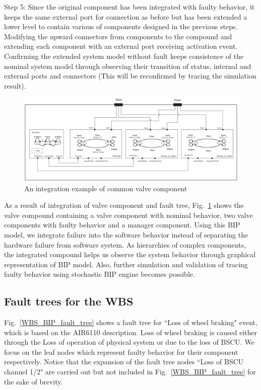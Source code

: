 Step 5: Since the original component has been integrated with faulty behavior, it keeps the same external port for connection as before but has been extended a lower level to contain various of components designed in the previous steps. Modifying the upward connectors from components to the compound and extending each component with an external port receiving activation event. Confirming the extended system model without fault keeps consistence of the nominal system model through observing their transition of status, internal and external ports and connectors (This will be reconfirmed by tracing the simulation result).

\begin{figure}[t]
	\centerline{\includegraphics[width=125mm]{figure/Example.eps}}
	\caption{An integration example of common valve component}
	\label{Example}
\end{figure}

As a result of integration of valve component and fault tree, Fig.~\ref{Example} shows the valve compound containing a valve component with nominal behavior, two valve components with faulty behavior and a manager component. Using this BIP model, we integrate failure into the software behavior instead of separating the hardware failure from software system. As hierarchies of complex components, the integrated compound helps us observe the system behavior through graphical representation of BIP model. Also, further simulation and validation of tracing faulty behavior using stochastic BIP engine becomes possible.


\subsection{Fault trees for the WBS}
Fig.~\ref{WBS_BIP_fault_tree} shows a fault tree for ``Loss of wheel braking" event, which is based on the AIR6110 description. Loss of wheel braking is caused either through the Loss of operation of physical system or due to the loss of BSCU. We focus on the leaf nodes which represent faulty behavior for their component respectively. Notice that the expansion of the fault tree nodes ``Loss of BSCU channel 1/2" are carried out but not included in Fig.~\ref{WBS_BIP_fault_tree} for the sake of brevity.

